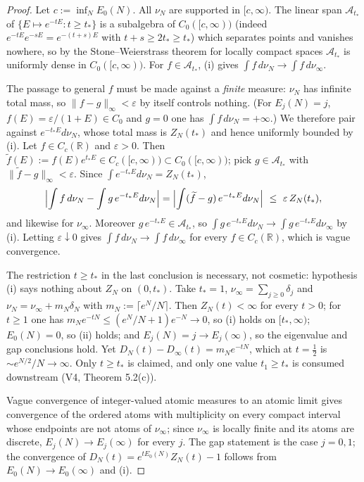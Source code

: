 \documentclass[11pt,a4paper]{article}
\theoremstyle{plain}
\theoremstyle{definition}
\newcommand{\R}{\mathbb{R}}
\newcommand{\eps}{\varepsilon}
\begin{document}
\begin{proof}
Let $c:=\inf_NE_0(N)$. All $\nu_N$ are supported in $[c,\infty)$. The linear span
$\mathscr A_{t_*}$ of $\{E\mapsto e^{-tE}:t\ge t_*\}$ is a subalgebra of
$C_0([c,\infty))$ (indeed $e^{-tE}e^{-sE}=e^{-(t+s)E}$ with $t+s\ge2t_*\ge t_*$)
which separates points and vanishes nowhere, so by the Stone--Weierstrass theorem
for locally compact spaces $\mathscr A_{t_*}$ is uniformly dense in
$C_0([c,\infty))$. For $f\in\mathscr A_{t_*}$, (i) gives
$\int f\,d\nu_N\to\int f\,d\nu_\infty$.

The passage to general $f$ must be made against a \emph{finite} measure: $\nu_N$
has infinite total mass, so $\|f-g\|_\infty<\eps$ by itself controls nothing.
(For $E_j(N)=j$, $f(E)=\eps/(1+E)\in C_0$ and $g=0$ one has
$\int f\,d\nu_N=+\infty$.) We therefore pair against $e^{-t_*E}d\nu_N$, whose total
mass is $Z_N(t_*)$ and hence uniformly bounded by (i). Let $f\in C_c(\R)$ and
$\eps>0$. Then $\widetilde f(E):=f(E)e^{t_*E}\in C_c([c,\infty))\subset
C_0([c,\infty))$; pick $g\in\mathscr A_{t_*}$ with
$\|\widetilde f-g\|_\infty<\eps$. Since $\int e^{-t_*E}d\nu_N=Z_N(t_*)$,
\[
 \Bigl|\int f\,d\nu_N-\int g\,e^{-t_*E}d\nu_N\Bigr|
 =\Bigl|\int(\widetilde f-g)\,e^{-t_*E}d\nu_N\Bigr|\ \le\ \eps\,Z_N(t_*),
\]
and likewise for $\nu_\infty$. Moreover $g\,e^{-t_*E}\in\mathscr A_{t_*}$, so
$\int g\,e^{-t_*E}d\nu_N\to\int g\,e^{-t_*E}d\nu_\infty$ by (i). Letting
$\eps\downarrow0$ gives $\int f\,d\nu_N\to\int f\,d\nu_\infty$ for every
$f\in C_c(\R)$, which is vague convergence.

The restriction $t\ge t_*$ in the last conclusion is necessary, not cosmetic:
hypothesis (i) says nothing about $Z_N$ on $(0,t_*)$. Take $t_*=1$,
$\nu_\infty=\sum_{j\ge0}\delta_j$ and $\nu_N=\nu_\infty+m_N\delta_N$ with
$m_N:=\lceil e^N/N\rceil$. Then $Z_N(t)<\infty$ for every $t>0$; for $t\ge1$ one has
$m_Ne^{-tN}\le(e^N/N+1)e^{-N}\to0$, so (i) holds on $[t_*,\infty)$; $E_0(N)=0$, so (ii)
holds; and $E_j(N)=j\to E_j(\infty)$, so the eigenvalue and gap conclusions hold. Yet
$D_N(t)-D_\infty(t)=m_Ne^{-tN}$, which at $t=\tfrac12$ is $\sim e^{N/2}/N\to\infty$.
Only $t\ge t_*$ is claimed, and only one value $t_1\ge t_*$ is consumed downstream
(V4, Theorem 5.2(c)).

Vague convergence of integer-valued atomic measures to an atomic limit gives
convergence of the ordered atoms with multiplicity on every compact interval whose
endpoints are not atoms of $\nu_\infty$; since $\nu_\infty$ is locally finite and its
atoms are discrete, $E_j(N)\to E_j(\infty)$ for every $j$. The gap statement is the
case $j=0,1$; the convergence of
$D_N(t)=e^{tE_0(N)}Z_N(t)-1$ follows from $E_0(N)\to E_0(\infty)$ and (i).
\end{proof}
\end{document}
